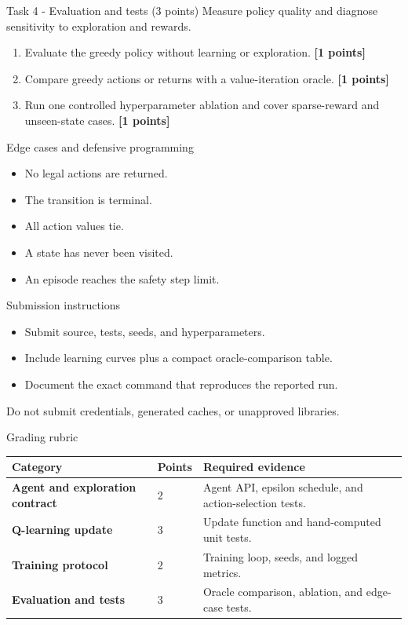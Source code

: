\documentclass[aspectratio=169,11pt]{beamer}
\begin{document}
\begin{frame}{Task 4 - Evaluation and tests (3 points)}
\small
Measure policy quality and diagnose sensitivity to exploration and rewards.

\vspace{0.2cm}
\begin{enumerate}
\item[\textbf{a.}] Evaluate the greedy policy without learning or exploration. \hfill{\color{courseblue}\textbf{[1 points]}}
\item[\textbf{b.}] Compare greedy actions or returns with a value-iteration oracle. \hfill{\color{courseblue}\textbf{[1 points]}}
\item[\textbf{c.}] Run one controlled hyperparameter ablation and cover sparse-reward and unseen-state cases. \hfill{\color{courseblue}\textbf{[1 points]}}
\end{enumerate}
\end{frame}

\begin{frame}{Edge cases and defensive programming}
\small
\begin{itemize}
  \item No legal actions are returned.
  \item The transition is terminal.
  \item All action values tie.
  \item A state has never been visited.
  \item An episode reaches the safety step limit.
\end{itemize}
\end{frame}

\begin{frame}{Submission instructions}
\small
\begin{itemize}
  \item Submit source, tests, seeds, and hyperparameters.
  \item Include learning curves plus a compact oracle-comparison table.
  \item Document the exact command that reproduces the reported run.
\end{itemize}
\vspace{0.2cm}
\alert{Do not submit credentials, generated caches, or unapproved libraries.}
\end{frame}

\begin{frame}{Grading rubric}
\scriptsize
\begin{tabularx}{\textwidth}{>{\bfseries}p{} p{} X}
\toprule
Category & Points & Required evidence \\
\midrule
Agent and exploration contract & 2 & Agent API, epsilon schedule, and action-selection tests. \\
Q-learning update & 3 & Update function and hand-computed unit tests. \\
Training protocol & 2 & Training loop, seeds, and logged metrics. \\
Evaluation and tests & 3 & Oracle comparison, ablation, and edge-case tests. \\
\bottomrule
\end{tabularx}
\end{frame}
\end{document}
